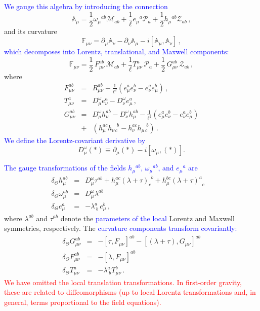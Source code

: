\documentclass [prd,reprint,eqsecnum,nofootinbib]  {revtex4-1}
\newcommand{\lang}[1]{\textcolor{blue}{#1}}
\newcommand{\science}[1]{\textcolor{red}{#1}}
\begin{document}
\lang{We gauge this algebra by introducing the connection}
\begin{equation}\label{2}
\mathbb{A}_{\mu}=\frac{1}{2}\omega_\mu{}^{ab}
\mathcal{M}_{ab}+\frac{1}{\ell}e_\mu{}^{a}
\mathcal{P}_{a}+\frac{1}{2}h_\mu{}^{ab} \mathcal{Z}_{ab}\,,
\end{equation}
and its curvature
\begin{equation}\label{3}
\mathbb{F}_{\mu\nu}=\partial_\mu\mathbb{A}_{\nu}-\partial_\nu\mathbb{A}_{\mu}-i[\mathbb{A}_{\mu},\mathbb{A}_{\nu}]\,,
\end{equation}
\lang{which decomposes into Lorentz, translational, and Maxwell
components:}
\begin{equation}\label{4}
\mathbb{F}_{\mu\nu}=\frac12\, F_{\mu\nu}^{ab}\, \mathcal{M}_{ab}
+\frac{1}{\ell}T_{\mu\nu}^{a}\,\mathcal{P}_{a}+ \frac12\,
G_{\mu\nu}^{ab}\, \mathcal{Z}_{ab}\,,
\end{equation}
where
\begin{eqnarray}
F_{\mu\nu}^{ab}&=&R^{ab}_{\mu\nu}+\frac{1}{\ell^2}( e^a_\mu e^b_\nu- e^a_\nu e^b_\mu) \,,\label{5a}\\
T_{\mu\nu}^{a}&=&D^\omega_\mu e^a_\nu -D^\omega_\nu e^a_\mu\,,\label{5b}\\
G_{\mu\nu}^{ab}&=&D^\omega_\mu h^{ab}_\nu -D^\omega_\nu
h^{ab}_\mu\nonumber-\frac{1}{\ell^2}( e^a_\mu e^b_\nu- e^a_\nu
e^b_\mu)\\ &+&(h^{ac}_\mu h^{\quad b}_{\nu\,c}-h^{ac}_\nu h^{\quad
b}_{\mu\,c})\, .\label{5c}
\end{eqnarray}
\lang{We define the Lorentz-covariant derivative by}
\begin{equation*}
D^\omega_\mu(\ast)\equiv
\partial_\mu(\ast)-i[\omega_\mu,(\ast)].
\end{equation*}

\lang{The gauge transformations of the fields $h_\mu{}^{ab}$,
$\omega_\mu{}^{ab}$, and $e_\mu{}^{a}$ are}
\begin{eqnarray}
        \delta_\Theta h^{ab}_{\mu}&=&D^\omega_\mu \tau^{ab}+
h^{ac}_\mu(\lambda+\tau)_{c}^{\;\,b}+h^{bc}_\mu(\lambda+\tau)^{a}_{\;\;c}\label{6}\quad\\
      \delta_\Theta \omega^{ab}_{\mu}&=& D^\omega_\mu \lambda^{ab}
      \label{7}\\
   \delta_\Theta e^{a}_{\mu}&=&-\lambda^a_{\;b}
    \,e^b_\mu\,,\label{8}
\end{eqnarray}
where $\lambda^{ab}$ and $\tau^{ab}$ denote the \lang{parameters of the local}
 Lorentz and Maxwell symmetries, respectively. The
\lang{curvature components transform covariantly:}
\begin{eqnarray}
        \delta_\Theta G^{ab}_{\mu\nu}&=&-[\tau,F_{\mu\nu}]^{ab}-[(\lambda+\tau),G_{\mu\nu}]^{ab}\label{9}\\
      \delta_\Theta F^{ab}_{\mu\nu}&=&-[\lambda,F_{\mu\nu}]^{ab}  \label{10}\\
    \delta_\Theta
    T^{a}_{\mu\nu}&=&-\lambda^a_{\;b}T^b_{\mu\nu}\,.\label{11}
\end{eqnarray}
\science{We have omitted the local translation transformations.
In first-order gravity, these are related to diffeomorphisms (up to
local Lorentz transformations and, in general, terms proportional to
the field equations).}
\end{document}
